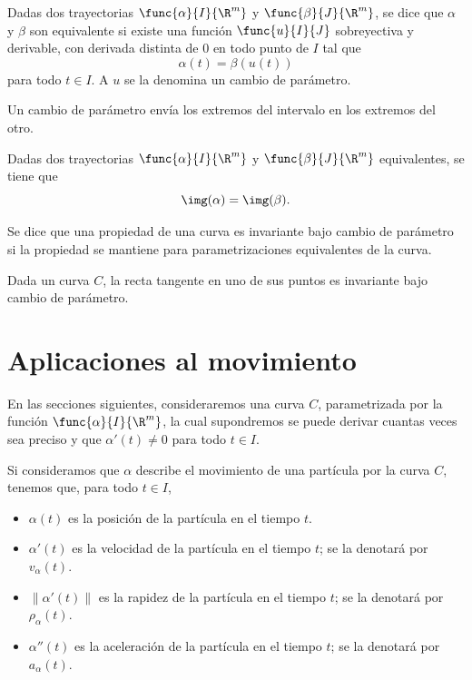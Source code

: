 \documentclass[a4,11pt]{aleph-notas}
\begin{document}
\begin{defi}
    Dadas dos trayectorias $\func{\alpha}{I}{\R^m}$ y $\func{\beta}{J}{\R^m}$, se dice que $\alpha$ y $\beta$ son equivalente si existe una función $\func{u}{I}{J}$ sobreyectiva y derivable, con derivada distinta de 0 en todo punto de $I$ tal que
    \[
        \alpha(t)=\beta(u(t))
    \]
    para todo $t\in I$. A $u$ se la denomina un cambio de parámetro.
\end{defi}

\begin{prop}
    Un cambio de parámetro envía los extremos del intervalo en los extremos del otro.
\end{prop}

\begin{prop}
    Dadas dos trayectorias $\func{\alpha}{I}{\R^m}$ y $\func{\beta}{J}{\R^m}$ equivalentes, se tiene que
    \[
        \img(\alpha)=\img(\beta).
    \]
\end{prop}

\begin{advertencia}
    Se dice que una propiedad de una curva es invariante bajo cambio de parámetro si la propiedad se mantiene para parametrizaciones equivalentes de la curva.
\end{advertencia}

\begin{prop}
    Dada un curva $C$, la recta tangente en uno de sus puntos es invariante bajo cambio de parámetro.
\end{prop}

\section{Aplicaciones al movimiento}

En las secciones siguientes, consideraremos una curva $C$, parametrizada por la función $\func{\alpha}{I}{\R^m}$, la cual supondremos se puede derivar cuantas veces sea preciso y que $\alpha'(t)\neq 0$ para todo $t\in I$.

\begin{defi}
    Si consideramos que $\alpha$ describe el movimiento de una partícula por la curva $C$, tenemos que, para todo $t\in I$,
    \begin{itemize}
        \item $\alpha(t)$ es la posición de la partícula en el tiempo $t$.
        \item $\alpha'(t)$ es la velocidad de la partícula en el tiempo $t$; se la denotará por $v_\alpha(t)$.
        \item $\|\alpha'(t)\|$ es la rapidez de la partícula en el tiempo $t$; se la denotará por $\rho_\alpha(t)$.
        \item $\alpha''(t)$ es la aceleración de la partícula en el tiempo $t$; se la denotará por $a_\alpha(t)$.
    \end{itemize}
\end{defi}
\end{document}
